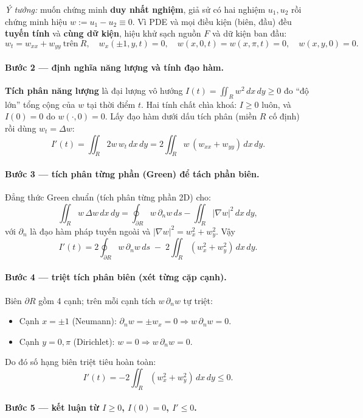 \emph{Ý tưởng:} muốn chứng minh \textbf{duy nhất nghiệm}, giả sử có hai nghiệm $u_1,u_2$ rồi chứng minh hiệu $w:=u_1-u_2\equiv0$. Vì PDE và mọi điều kiện (biên, đầu) đều \textbf{tuyến tính} và \textbf{cùng dữ kiện}, hiệu khử sạch nguồn $F$ và dữ kiện ban đầu:
\[
  w_t=w_{xx}+w_{yy}\ \text{trên}\ R,\quad
  w_x(\pm1,y,t)=0,\quad w(x,0,t)=w(x,\pi,t)=0,\quad w(x,y,0)=0.
\]

\paragraph{Bước 2 --- định nghĩa năng lượng và tính đạo hàm.}\leavevmode

\textbf{Tích phân năng lượng} là đại lượng vô hướng $I(t)=\iint_R w^2\,dx\,dy\ge0$ đo ``độ lớn'' tổng cộng của $w$ tại thời điểm $t$. Hai tính chất chìa khoá: $I\ge0$ luôn, và $I(0)=0$ do $w(\cdot,0)=0$. Lấy đạo hàm dưới dấu tích phân (miền $R$ cố định) rồi dùng $w_t=\Delta w$:
\[
  I'(t)=\iint_R 2w\,w_t\,dx\,dy=2\iint_R w\,(w_{xx}+w_{yy})\,dx\,dy.
\]

\paragraph{Bước 3 --- tích phân từng phần (Green) để tách phần biên.}\leavevmode

Đẳng thức Green chuẩn (tích phân từng phần 2D) cho:
\[
  \iint_R w\,\Delta w\,dx\,dy=\oint_{\partial R} w\,\partial_n w\,ds-\iint_R |\nabla w|^2\,dx\,dy,
\]
với $\partial_n$ là đạo hàm pháp tuyến ngoài và $|\nabla w|^2=w_x^2+w_y^2$. Vậy
\[
  I'(t)=2\oint_{\partial R} w\,\partial_n w\,ds\;-\;2\iint_R(w_x^2+w_y^2)\,dx\,dy.
\]

\paragraph{Bước 4 --- triệt tích phân biên (xét từng cặp cạnh).}\leavevmode

Biên $\partial R$ gồm 4 cạnh; trên mỗi cạnh tích $w\,\partial_n w$ tự triệt:
\begin{itemize}
\item Cạnh $x=\pm1$ (Neumann): $\partial_n w=\pm w_x=0\Rightarrow w\,\partial_n w=0$.
\item Cạnh $y=0,\pi$ (Dirichlet): $w=0\Rightarrow w\,\partial_n w=0$.
\end{itemize}
Do đó số hạng biên triệt tiêu hoàn toàn:
\[
  I'(t)=-2\iint_R(w_x^2+w_y^2)\,dx\,dy\le0.
\]

\paragraph{Bước 5 --- kết luận từ $I\ge0$, $I(0)=0$, $I'\le0$.}\leavevmode


